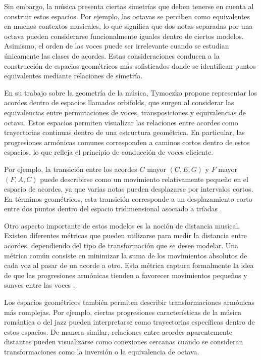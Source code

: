 \documentclass[12pt]{report}
\begin{document}
Sin embargo, la música presenta ciertas simetrías que deben tenerse en cuenta al construir estos espacios. Por ejemplo, las octavas se perciben como equivalentes en muchos contextos musicales, lo que significa que dos notas separadas por una octava pueden considerarse funcionalmente iguales dentro de ciertos modelos. Asimismo, el orden de las voces puede ser irrelevante cuando se estudian únicamente las clases de acordes. Estas consideraciones conducen a la construcción de espacios geométricos más sofisticados donde se identifican puntos equivalentes mediante relaciones de simetría.

En su trabajo sobre la geometría de la música, Tymoczko\cite{tymoczko2011geometry} propone representar los acordes dentro de espacios llamados orbifolds, que surgen al considerar las equivalencias entre permutaciones de voces, transposiciones y equivalencias de octava. Estos espacios permiten visualizar las relaciones entre acordes como trayectorias continuas dentro de una estructura geométrica. En particular, las progresiones armónicas comunes corresponden a caminos cortos dentro de estos espacios, lo que refleja el principio de conducción de voces eficiente.

Por ejemplo, la transición entre los acordes $C$ mayor $(C,E,G)$ y $F$ mayor $(F,A,C)$ puede describirse como un movimiento relativamente pequeño en el espacio de acordes, ya que varias notas pueden desplazarse por intervalos cortos. En términos geométricos, esta transición corresponde a un desplazamiento corto entre dos puntos dentro del espacio tridimensional asociado a tríadas \cite{bent2011modalogy}.

Otro aspecto importante de estos modelos es la noción de distancia musical. Existen diferentes métricas que pueden utilizarse para medir la distancia entre acordes, dependiendo del tipo de transformación que se desee modelar. Una métrica común consiste en minimizar la suma de los movimientos absolutos de cada voz al pasar de un acorde a otro. Esta métrica captura formalmente la idea de que las progresiones armónicas tienden a favorecer movimientos pequeños y suaves entre las voces \cite{tymoczko2008scale}.

Los espacios geométricos también permiten describir transformaciones armónicas más complejas. Por ejemplo, ciertas progresiones características de la música romántica o del jazz pueden interpretarse como trayectorias específicas dentro de estos espacios. De manera similar, relaciones entre acordes aparentemente distantes pueden visualizarse como conexiones cercanas cuando se consideran transformaciones como la inversión o la equivalencia de octava.
\end{document}
